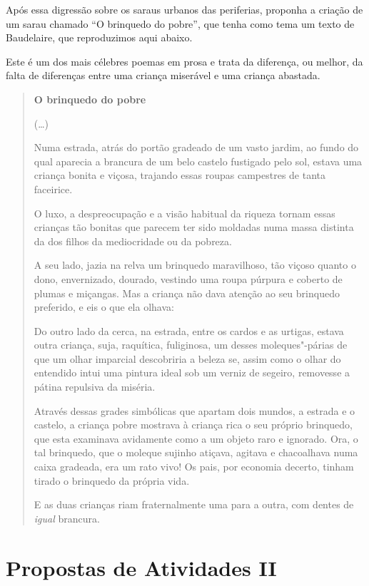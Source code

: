 \documentclass[12pt]{extarticle}
\begin{document}
Após essa digressão sobre os saraus urbanos das periferias, proponha
a criação de um sarau chamado ``O brinquedo do pobre'', que tenha como tema um texto de Baudelaire,
que reproduzimos aqui abaixo.

Este é um 
dos mais célebres poemas em prosa e trata da diferença, ou melhor, da 
falta de diferenças entre
uma criança miserável e uma criança abastada.

\begin{quote}
\textbf{O brinquedo do pobre}\medskip

(\ldots{})

Numa estrada, atrás do portão gradeado de um vasto jardim, ao fundo do qual aparecia
a brancura de um belo castelo fustigado pelo sol, estava uma
criança bonita e viçosa, trajando essas roupas campestres de tanta
faceirice.

O luxo, a despreocupação e a visão habitual da riqueza tornam essas
crianças tão bonitas que parecem ter sido moldadas numa massa distinta da
dos filhos da mediocridade ou da pobreza.

A seu lado, jazia na relva um brinquedo maravilhoso, tão viçoso
quanto o dono, envernizado, dourado, vestindo uma roupa púrpura
e coberto de plumas e miçangas. Mas a criança não dava atenção ao seu
brinquedo preferido, e eis o que ela olhava:

Do outro lado da cerca, na estrada, entre os cardos e as urtigas, estava
outra criança, suja, raquítica, fuliginosa, um desses moleques"-párias
de que um olhar imparcial descobriria a beleza se, assim como o olhar do
entendido intui uma pintura ideal sob um verniz de segeiro,
removesse a pátina repulsiva da miséria.

Através dessas grades simbólicas que apartam dois mundos, a estrada e o
castelo, a criança pobre mostrava à criança rica o seu próprio
brinquedo, que esta examinava avidamente como a um objeto raro e
ignorado. Ora, o tal brinquedo, que o moleque sujinho atiçava,
agitava e chacoalhava numa caixa gradeada, era um rato vivo! Os pais,
por economia decerto, tinham tirado o brinquedo da própria vida.

E as duas crianças riam fraternalmente uma para a outra, com dentes de
\textit{igual} brancura.
\end{quote}

\section{Propostas de Atividades II}
\end{document}
